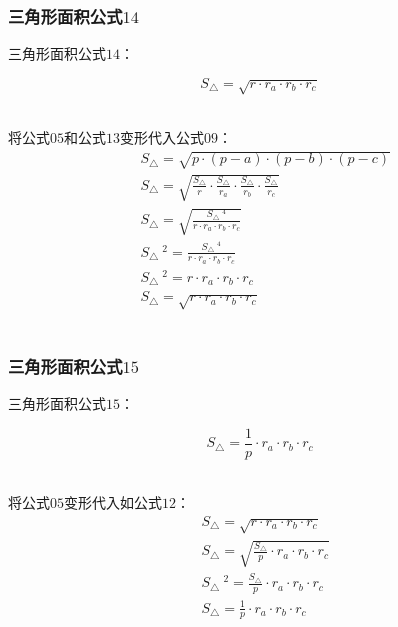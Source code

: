 \documentclass[UTF8]{ctexart}
\begin{document}
\subsubsection{三角形面积公式$14$}
    三角形面积公式$14$：
    \begin{large}
        \begin{equation*}
            S_{\triangle}=\sqrt{r\cdot r_a\cdot r_b\cdot r_c}
        \end{equation*}
    \end{large}\\
    将公式$05$和公式$13$变形代入公式$09$：
    \setcounter{equation}{0}
    \begin{align}
        &S_{\triangle}=\sqrt{p\cdot(p-a)\cdot(p-b)\cdot(p-c)}\\[3mm]
        &S_{\triangle}=\sqrt{\frac{S_{\triangle}}{r}\cdot\frac{S_{\triangle}}{r_a}\cdot\frac{S_{\triangle}}{r_b}\cdot\frac{S_{\triangle}}{r_c}}\\[3mm]
        &S_{\triangle}=\sqrt{\frac{S_{\triangle}~^4}{r\cdot r_a\cdot r_b\cdot r_c}}\\[3mm]
        &S_{\triangle}~^2=\frac{S_{\triangle}~^4}{r\cdot r_a\cdot r_b\cdot r_c}\\[3mm]
        &S_{\triangle}~^2=r\cdot r_a\cdot r_b\cdot r_c\\[3mm]
        &S_{\triangle}=\sqrt{r\cdot r_a\cdot r_b\cdot r_c}
    \end{align}\\

\subsubsection{三角形面积公式$15$}
    三角形面积公式$15$：
    \begin{large}
        \begin{equation*}
            S_{\triangle}=\frac{1}{p}\cdot r_a\cdot r_b\cdot r_c
        \end{equation*}
    \end{large}\\
    将公式$05$变形代入如公式$12$：
    \setcounter{equation}{0}
    \begin{align}
        &S_{\triangle}=\sqrt{r\cdot r_a\cdot r_b\cdot r_c}\\[3mm]
        &S_{\triangle}=\sqrt{\frac{S_{\triangle}}{p}\cdot r_a\cdot r_b\cdot r_c}\\[3mm]
        &S_{\triangle}~^2=\frac{S_{\triangle}}{p}\cdot r_a\cdot r_b\cdot r_c\\[3mm]
        &S_{\triangle}=\frac{1}{p}\cdot r_a\cdot r_b\cdot r_c
    \end{align}
\end{document}
